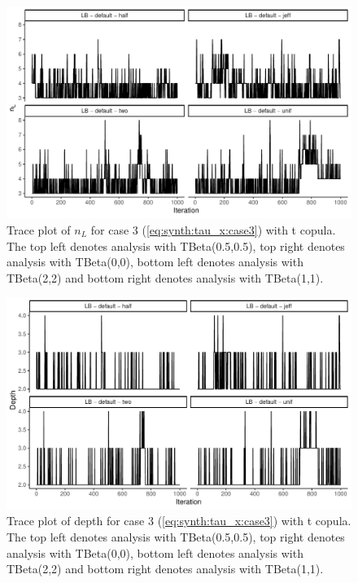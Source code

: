 \documentclass{amsart}
\begin{document}
\begin{figure}
	\centering
	\includegraphics[width = 0.75\linewidth]{trace_case3_t_nterm.pdf}
	\caption{Trace plot of $n_L$ for case 3 (\cref{eq:synth:tau_x:case3}) with t copula. The top left denotes analysis with TBeta(0.5,0.5), top right denotes analysis with TBeta(0,0), bottom left denotes analysis with TBeta(2,2) and bottom right denotes analysis with TBeta(1,1).}
	\label{fig:case3:t:nterm}
\end{figure}

\begin{figure}
	\centering
	\includegraphics[width = 0.75\linewidth]{trace_case3_t_depth.pdf}
	\caption{Trace plot of depth for case 3 (\cref{eq:synth:tau_x:case3}) with t copula. The top left denotes analysis with TBeta(0.5,0.5), top right denotes analysis with TBeta(0,0), bottom left denotes analysis with TBeta(2,2) and bottom right denotes analysis with TBeta(1,1).}
	\label{fig:case3:t:depth}
\end{figure}
\end{document}
